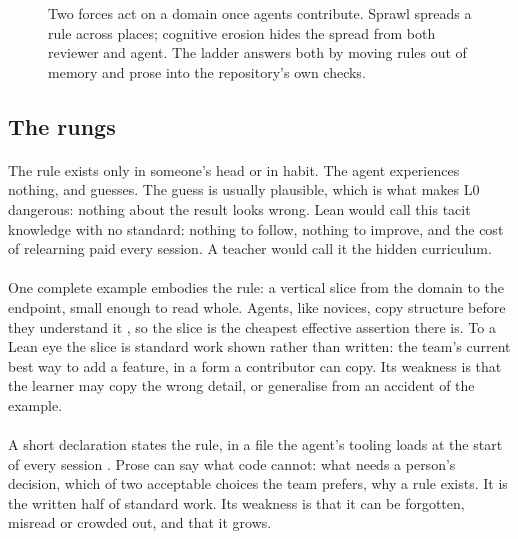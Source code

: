 \begin{figure}[t]
  \centering
  \resizebox{\linewidth}{!}{}
  \caption{Two forces act on a domain once agents contribute. Sprawl spreads a rule across
  places; cognitive erosion hides the spread from both reviewer and agent. The ladder answers
  both by moving rules out of memory and prose into the repository's own checks.}
  \label{fig:forces}
\end{figure}

\subsection{The rungs}

\paragraph{} The rule exists only in someone's head or in habit. The agent
experiences nothing, and guesses. The guess is usually plausible, which is what makes L0
dangerous: nothing about the result looks wrong. Lean would call this tacit knowledge with no
standard: nothing to follow, nothing to improve, and the cost of relearning paid every session.
A teacher would call it the hidden curriculum.

\paragraph{} One complete example embodies the rule: a vertical slice from the
domain to the endpoint, small enough to read whole. Agents, like novices, copy structure before
they understand it \citep{sweller1985worked}, so the slice is the cheapest effective assertion
there is. To a Lean eye the slice is standard work shown rather than written: the team's current
best way to add a feature, in a form a contributor can copy. Its weakness is that the learner may
copy the wrong detail, or generalise from an accident of the example.

\paragraph{} A short declaration states the rule, in a file the agent's tooling
loads at the start of every session \citep{agentsmd}. Prose can say what code cannot: what needs
a person's decision, which of two acceptable choices the team prefers, why a rule exists. It is
the written half of standard work. Its weakness is that it can be forgotten, misread or crowded
out, and that it grows.

